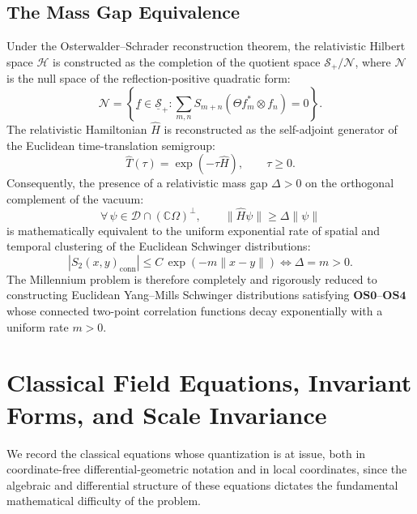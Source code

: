 \subsection{The Mass Gap Equivalence}
\label{subsec:mass_gap_equivalence}
Under the Osterwalder--Schrader reconstruction theorem, the relativistic Hilbert space $\mathcal{H}$ is constructed as the completion of the quotient space $\mathcal{S}_+ / \mathcal{N}$, where $\mathcal{N}$ is the null space of the reflection-positive quadratic form:
\begin{equation}
\mathcal{N} = \left\{ \underline{f} \in \underline{\mathcal{S}}_+ : \sum_{m,n} S_{m+n}(\Theta f_m^* \otimes f_n) = 0 \right\}.
\end{equation}
The relativistic Hamiltonian $\hat{H}$ is reconstructed as the self-adjoint generator of the Euclidean time-translation semigroup:
\begin{equation}
\hat{T}(\tau) = \exp( -\tau \hat{H} ), \qquad \tau \ge 0.
\end{equation}
Consequently, the presence of a relativistic mass gap $\Delta > 0$ on the orthogonal complement of the vacuum:
\begin{equation}
\forall \, \psi \in \mathcal{D} \cap (\mathbb{C}\Omega)^\perp, \qquad \|\hat{H}\psi\| \ge \Delta \|\psi\|
\end{equation}
is mathematically equivalent to the uniform exponential rate of spatial and temporal clustering of the Euclidean Schwinger distributions:
\begin{equation}
\label{eq:clustering_to_gap_intro}
\left| S_2(x, y)_{\mathrm{conn}} \right| \le C \, \exp\left( -m \|x - y\| \right) \iff \Delta = m > 0.
\end{equation}
The Millennium problem is therefore completely and rigorously reduced to constructing Euclidean Yang--Mills Schwinger distributions satisfying $\mathbf{OS0}$--$\mathbf{OS4}$ whose connected two-point correlation functions decay exponentially with a uniform rate $m > 0$.


\section{Classical Field Equations, Invariant Forms, and Scale Invariance}
\label{sec:classical_equations}

We record the classical equations whose quantization is at issue, both in coordinate-free differential-geometric notation and in local coordinates, since the algebraic and differential structure of these equations dictates the fundamental mathematical difficulty of the problem.

